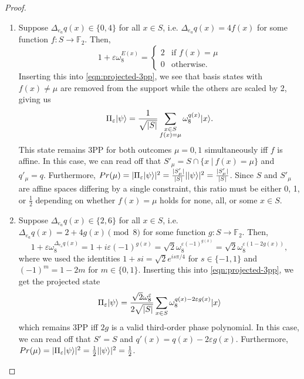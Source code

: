 \begin{proof}
\begin{enumerate}
\begin{enumerate}

\item
Suppose $\Delta_{e_a} q(x) \in \{ 0, 4 \}$ for all $x \in S$, i.e. $\Delta_{e_a} q(x) = 4f(x)$ for some function $f : S \to \mathbb F_2$.
Then,
\[
    1 + \varepsilon\omega_8^{E(x)}
    = \begin{cases}
        2 & \text{if } f(x) = \mu \\
        0 & \text{otherwise}.
    \end{cases}
\]
Inserting this into \cref{eqn:projected-3pp}, we see that basis states with $f(x) \neq \mu$ are removed from the support while the others are scaled by 2, giving us
\[ \Pi_\varepsilon|\psi\rangle = \frac{1}{\sqrt{|S|}} \sum_{\substack{x \in S \\ f(x) = \mu}} \omega_8^{q(x)} |x\rangle. \]
This state remains 3PP for both outcomes $\mu = 0,1$ simultaneously iff $f$ is affine.
In this case, we can read off that $S'_\mu = S \cap \{ x ~|~ f(x) = \mu \}$ and $q'_\mu = q$.
Furthermore, $Pr(\mu) = |\Pi_\varepsilon|\psi\rangle|^2 = \frac{|S'_\mu|}{|S|}||\psi\rangle|^2 = \frac{|S'_\mu|}{|S|}$.
Since $S$ and $S'_\mu$ are affine spaces differing by a single constraint, this ratio must be either 0, 1, or $\frac{1}{2}$ depending on whether $f(x) = \mu$ holds for none, all, or some $x \in S$.


\item
Suppose $\Delta_{e_a}q(x) \in \{2, 6\}$ for all $x \in S$, i.e. $\Delta_{e_a}q(x) = 2 + 4g(x) \pmod 8$ for some function $g: S \to \mathbb F_2$.
Then,
\[
    1 + \varepsilon\omega_8^{\Delta_{e_a}q(x)}
    = 1 + i\varepsilon(-1)^{g(x)}
    = \sqrt 2 \omega_8^{\varepsilon(-1)^{g(x)}}
    = \sqrt 2 \omega_8^{\varepsilon(1 - 2g(x))},
\]
where we used the identities $1+s i = \sqrt{2} e^{is\pi/4}$ for $s \in \{-1,1\}$ and  $(-1)^m = 1 - 2m$ for $m \in \{0,1\}$.
Inserting this into \cref{eqn:projected-3pp}, we get the projected state
\[ \Pi_\varepsilon |\psi\rangle = \frac{\sqrt 2 \omega_8^\varepsilon}{2\sqrt{|S|}} \sum_{x \in S} \omega_8^{q(x) - 2\varepsilon g(x)} |x\rangle \]
which remains 3PP iff $2g$ is a valid third-order phase polynomial.
In this case, we can read off that $S' = S$ and $q'(x) = q(x) - 2\varepsilon g(x)$.
Furthermore, $Pr(\mu) = |\Pi_\varepsilon|\psi\rangle|^2 = \frac{1}{2}||\psi\rangle|^2 = \frac{1}{2}$.



\end{enumerate}
\end{enumerate}
\end{proof}
